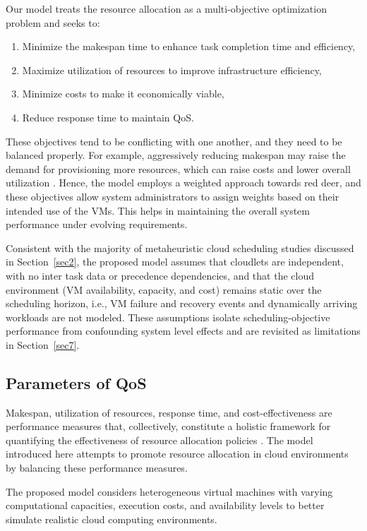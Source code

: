 \documentclass[pdflatex,sn-mathphys-num]{sn-jnl}%
\begin{document}
Our model treats the resource allocation as a multi-objective optimization problem and seeks to:
\begin{enumerate}
    \item Minimize the makespan time to enhance task completion time and efficiency,
    \item Maximize utilization of resources to improve infrastructure efficiency,
    \item Minimize costs to make it economically viable,
    \item Reduce response time to maintain QoS.
\end{enumerate}

These objectives tend to be conflicting with one another, and they need to be balanced properly. For example, aggressively reducing makespan may raise the demand for provisioning more resources, which can raise costs and lower overall utilization \cite{GWO}. Hence, the model employs a weighted approach towards red deer, and these objectives allow system administrators to assign weights based on their intended use of the VMs. This helps in maintaining the overall system performance under evolving requirements.

Consistent with the majority of metaheuristic cloud scheduling studies discussed in Section~\ref{sec2}, the proposed model assumes that cloudlets are independent, with no inter task data or precedence dependencies, and that the cloud environment (VM availability, capacity, and cost) remains static over the scheduling horizon, i.e., VM failure and recovery events and dynamically arriving workloads are not modeled. These assumptions isolate scheduling-objective performance from confounding system level effects and are revisited as limitations in Section~\ref{sec7}.

\subsection{Parameters of QoS}\label{subsec3.2}

Makespan, utilization of resources, response time, and cost-effectiveness are performance measures that, collectively, constitute a holistic framework for quantifying the effectiveness of resource allocation policies \cite{bib12}. The model introduced here attempts to promote resource allocation in cloud environments by balancing these performance measures.

The proposed model considers heterogeneous virtual machines with varying computational capacities, execution costs, and availability levels to better simulate realistic cloud computing environments.
\end{document}
